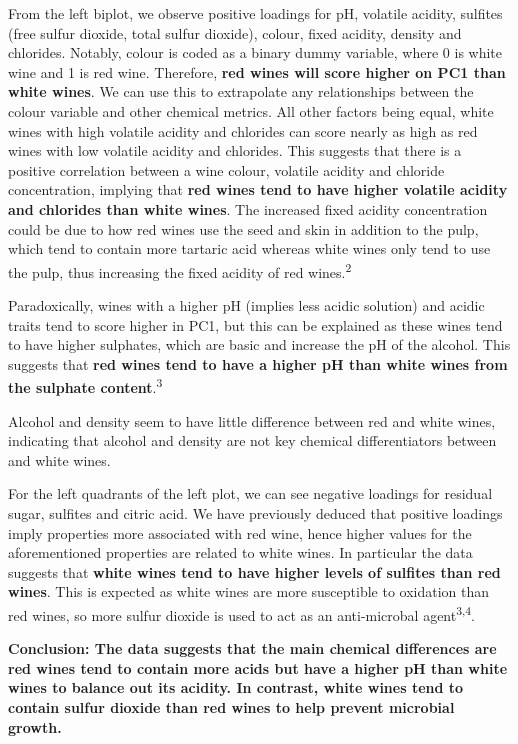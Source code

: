 \documentclass[
]{article}
\begin{document}
From the left biplot, we observe positive loadings for pH, volatile
acidity, sulfites (free sulfur dioxide, total sulfur dioxide), colour,
fixed acidity, density and chlorides. Notably, colour is coded as a
binary dummy variable, where 0 is white wine and 1 is red wine.
Therefore, \textbf{red wines will score higher on PC1 than white wines}.
We can use this to extrapolate any relationships between the colour
variable and other chemical metrics. All other factors being equal,
white wines with high volatile acidity and chlorides can score nearly as
high as red wines with low volatile acidity and chlorides. This suggests
that there is a positive correlation between a wine colour, volatile
acidity and chloride concentration, implying that \textbf{red wines tend
to have higher volatile acidity and chlorides than white wines}. The
increased fixed acidity concentration could be due to how red wines use
the seed and skin in addition to the pulp, which tend to contain more
tartaric acid whereas white wines only tend to use the pulp, thus
increasing the fixed acidity of red wines.\textsuperscript{2}

Paradoxically, wines with a higher pH (implies less acidic solution) and
acidic traits tend to score higher in PC1, but this can be explained as
these wines tend to have higher sulphates, which are basic and increase
the pH of the alcohol. This suggests that \textbf{red wines tend to have
a higher pH than white wines from the sulphate
content}.\textsuperscript{3}

Alcohol and density seem to have little difference between red and white
wines, indicating that alcohol and density are not key chemical
differentiators between and white wines.

For the left quadrants of the left plot, we can see negative loadings
for residual sugar, sulfites and citric acid. We have previously deduced
that positive loadings imply properties more associated with red wine,
hence higher values for the aforementioned properties are related to
white wines. In particular the data suggests that \textbf{white wines
tend to have higher levels of sulfites than red wines}. This is expected
as white wines are more susceptible to oxidation than red wines, so more
sulfur dioxide is used to act as an anti-microbal
agent\textsuperscript{3,4}.

\textbf{Conclusion: The data suggests that the main chemical differences
are red wines tend to contain more acids but have a higher pH than white
wines to balance out its acidity. In contrast, white wines tend to
contain sulfur dioxide than red wines to help prevent microbial growth.}
\end{document}
